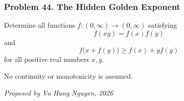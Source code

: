 \subsubsection*{Problem 44. The Hidden Golden Exponent}

\begin{exercisebox}[medium]

Determine all functions $f:(0,\infty)\to(0,\infty)$ satisfying
\[
f(xy)=f(x)f(y)
\]
and
\[
\boxed{\qquad
f\bigl(x+f(y)\bigr)\ge f(x)+y f(y)
\qquad}
\]
for all positive real numbers $x,y$.

No continuity or monotonicity is assumed.

\begin{flushright}
\textit{Proposed by Vu Hung Nguyen, 2026}
\end{flushright}


\end{exercisebox}
